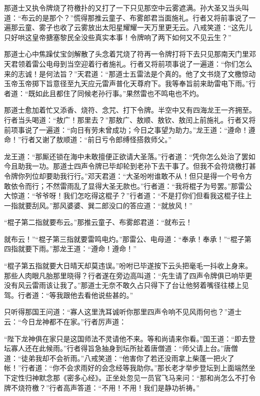 \documentclass[12pt,UTF8]{ctexbook}
\begin{document}
那道士又执令牌烧了符檄扑的又打了一下只见那空中云雾遮满。孙大圣又当头叫道：“布云的是那个？”慌得那推云童子、布雾郎君当面施礼。行者又将前事说了一遍那云童、雾子也收了云雾放出太阳星耀耀一天万里更无云。八戒笑道：“这先儿只好哄这皇帝搪塞黎民全没些真实本事！令牌响了两下如何又不见云生？”

那道士心中焦躁仗宝剑解散了头念着咒烧了符再一令牌打将下去只见那南天门里邓天君领着雷公电母到当空迎着行者施礼。行者又将前项事说了一遍道：“你们怎么来的志诚！是何法旨？”天君道：“那道士五雷法是个真的。他了文书烧了文檄惊动玉帝玉帝掷下旨意径至九天应元雷声普化天尊府下。我等奉旨前来助雷电下雨。”行者道：“既如此且都住了同候老孙行事。”果然雷也不鸣电也不灼。

那道士愈加着忙又添香、烧符、念咒、打下令牌。半空中又有四海龙王一齐拥至。行者当头喝道：“敖广！那里去？”那敖广、敖顺、敖钦、敖闰上前施礼。行者又将前项事说了一遍道：“向日有劳未曾成功；今日之事望为助力。”龙王道：“遵命！遵命！”行者又谢了敖顺道：“前日亏令郎缚怪搭救师父。”

龙王道：“那厮还锁在海中未敢擅便正欲请大圣落。”行者道：“凭你怎么处治了罢如今且助我一功。那道士四声令牌已毕却轮到老孙下去干事了。但我不会符烧檄打甚令牌你列位却要助我行行。”邓天君道：“大圣吩咐谁敢不从！但只是得一个号令方敢依令而行；不然雷雨乱了显得大圣无款也。”行者道：“我将棍子为号罢。”那雷公大惊道：“爷爷呀！我们怎吃得这棍子？”行者道：“不是打你们但看我这棍子往上一指就要刮风。”那风婆婆、巽二郎没口的答应道：“就放风！”

“棍子第二指就要布云。”那推云童子、布雾郎君道：“就布云！

就布云！”“棍子第三指就要雷鸣电灼。”那雷公、电母道：“奉承！奉承！”“棍子第四指就要下雨。”那龙王道：“遵命！遵命！”

“棍子第五指就要大日晴天却莫违误。”吩咐已毕遂按下云头把毫毛一抖收上身来。那些人肉眼凡胎那里晓得？行者遂在旁边高叫道：“先生请了四声令牌俱已响毕更没有风云雷雨该让我了。”那道士无奈不敢久占只得下了台让他努着嘴径往楼上见驾。行者道：“等我跟他去看他说些甚的。”

只听得那国王问道：“寡人这里洗耳诚听你那里四声令响不见风雨何也？”道士云：“今日龙神都不在家。”行者厉声道：

“陛下龙神俱在家只是这国师法不灵请他不来。等和尚请来你看。”国王道：“即去登坛寡人还在此候雨。”行者得旨急抽身到坛所扯着唐僧道：“师父请上台。”唐僧道：“徒弟我却不会祈雨。”八戒笑道：“他害你了若还没雨拿上柴蓬一把火了帐！”行者道：“你不会求雨好的会念经等我助你。”那长老才举步登坛到上面端然坐下定性归神默念那《密多心经》。正坐处忽见一员官飞马来问：“那和尚怎么不打令牌不烧符檄？”行者高声答道：“不用！不用！我们是静功祈祷。”
\end{document}
